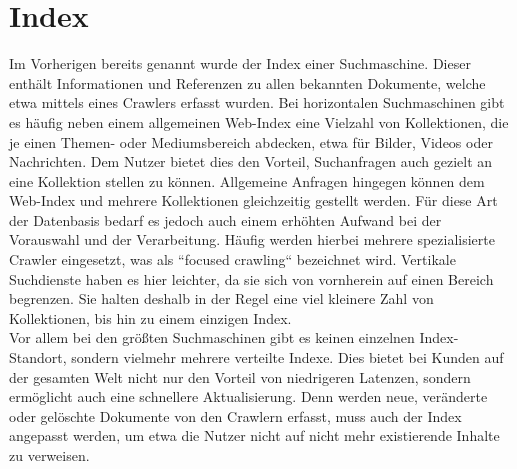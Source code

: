 \section{Index}
\label{sec:Index}
Im Vorherigen bereits genannt wurde der Index einer Suchmaschine. Dieser enthält Informationen und Referenzen zu allen bekannten Dokumente, welche etwa mittels eines Crawlers erfasst wurden. Bei horizontalen Suchmaschinen gibt es häufig neben einem allgemeinen Web-Index eine Vielzahl von Kollektionen, die je einen Themen- oder Mediumsbereich abdecken, etwa für Bilder, Videos oder Nachrichten. Dem Nutzer bietet dies den Vorteil, Suchanfragen auch gezielt an eine Kollektion stellen zu können. Allgemeine Anfragen hingegen können dem Web-Index und mehrere Kollektionen gleichzeitig gestellt werden. Für diese Art der Datenbasis bedarf es jedoch auch einem erhöhten Aufwand bei der Vorauswahl und der Verarbeitung. Häufig werden hierbei mehrere spezialisierte Crawler eingesetzt, was als ``focused crawling`` bezeichnet wird. Vertikale Suchdienste haben es hier leichter, da sie sich von vornherein auf einen Bereich begrenzen. Sie halten deshalb in der Regel eine viel kleinere Zahl von Kollektionen, bis hin zu einem einzigen Index.\\
Vor allem bei den größten Suchmaschinen gibt es keinen einzelnen Index-Standort, sondern vielmehr mehrere verteilte Indexe. Dies bietet bei Kunden auf der gesamten Welt nicht nur den Vorteil von niedrigeren Latenzen, sondern ermöglicht auch eine schnellere Aktualisierung. Denn werden neue, veränderte oder gelöschte Dokumente von den Crawlern erfasst, muss auch der Index angepasst werden, um etwa die Nutzer nicht auf nicht mehr existierende Inhalte zu verweisen. \cite{suchmverst} \cite{wikiindex}

